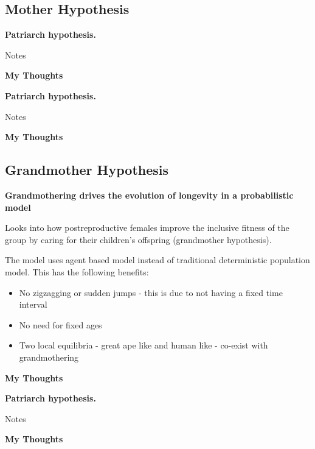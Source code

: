 \subsection{Mother Hypothesis}
\begin{framed}
\noindent \textbf{Patriarch hypothesis. \cite{patriarchHypothesis2000}}

Notes

\noindent \textbf{My Thoughts}


\end{framed}

\begin{framed}
\noindent \textbf{Patriarch hypothesis. \cite{patriarchHypothesis2000}}

Notes

\noindent \textbf{My Thoughts}


\end{framed}

\subsection{Grandmother Hypothesis}
\begin{framed}
\noindent \textbf{Grandmothering drives the evolution of longevity in a probabilistic model \cite{grandmotheringProbabilistic2014}}

Looks into how postreproductive females improve the inclusive fitness of the group by caring for their children's offspring (grandmother hypothesis).

The model uses agent based model instead of traditional deterministic population model. This has the following benefits:
\begin{itemize}
    \item No zigzagging or sudden jumps - this is due to not having a fixed time interval
    \item No need for fixed ages
    \item Two local equilibria - great ape like and human like - co-exist with grandmothering
\end{itemize}



\noindent \textbf{My Thoughts}

\end{framed}

\begin{framed}
\noindent \textbf{Patriarch hypothesis. \cite{patriarchHypothesis2000}}

Notes

\noindent \textbf{My Thoughts}


\end{framed}


